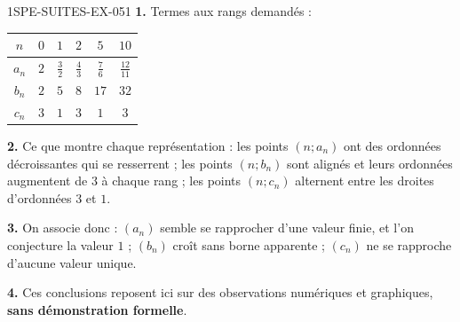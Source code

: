 \begin{corrige}{1SPE-SUITES-EX-051}
\textbf{1.} Termes aux rangs demandés :

\begin{center}
\begin{tabular}{c|ccccc}
$n$ & $0$ & $1$ & $2$ & $5$ & $10$ \\ \hline
$a_n$ & $2$ & $\frac32$ & $\frac43$ & $\frac76$ & $\frac{12}{11}$ \\
$b_n$ & $2$ & $5$ & $8$ & $17$ & $32$ \\
$c_n$ & $3$ & $1$ & $3$ & $1$ & $3$
\end{tabular}
\end{center}

\textbf{2.} Ce que montre chaque représentation : les points $(n;a_n)$ ont des
ordonnées décroissantes qui se resserrent ; les points $(n;b_n)$ sont alignés et
leurs ordonnées augmentent de $3$ à chaque rang ; les points $(n;c_n)$ alternent
entre les droites d'ordonnées $3$ et $1$.

\textbf{3.} On associe donc : $(a_n)$ semble se rapprocher d'une valeur finie,
et l'on conjecture la valeur $1$ ; $(b_n)$ croît sans borne apparente ; $(c_n)$
ne se rapproche d'aucune valeur unique.

\textbf{4.} Ces conclusions reposent ici sur des observations numériques et
graphiques, \textbf{sans démonstration formelle}.
\end{corrige}
